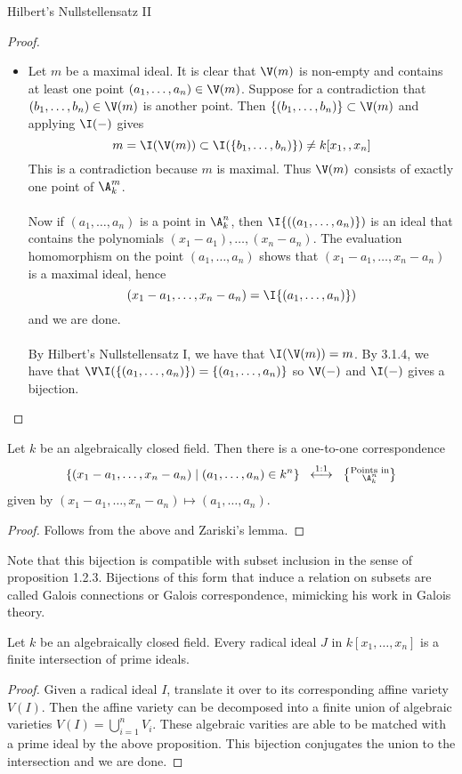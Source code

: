 \documentclass[a4paper]{article}
\begin{document}
\begin{thm}{Hilbert's Nullstellensatz II}{}
\begin{proof}
\begin{itemize}
\item Let $m$ be a maximal ideal. It is clear that $\V(m)$ is non-empty and contains at least one point $(a_1,\dots,a_n)\in\V(m)$. Suppose for a contradiction that $(b_1,\dots,b_n)\in\V(m)$ is another point. Then $\{(b_1,\dots,b_n)\}\subset\V(m)$ and applying $\I(-)$ gives $$m=\I(\V(m))\subset\I(\{b_1,\dots,b_n)\})\neq k[x_1,\do,x_n]$$ This is a contradiction because $m$ is maximal. Thus $\V(m)$ consists of exactly one point of $\A_k^m$. \\~\\

Now if $(a_1,\dots,a_n)$ is a point in $\A_k^n$, then $\I\{((a_1,\dots,a_n)\})$ is an ideal that contains the polynomials $(x_1-a_1),\dots,(x_n-a_n)$. The evaluation homomorphism on the point $(a_1,\dots,a_n)$ shows that $(x_1-a_1,\dots,x_n-a_n)$ is a maximal ideal, hence $$(x_1-a_1,\dots,x_n-a_n)=\I\{(a_1,\dots,a_n)\})$$ and we are done. \\~\\

By Hilbert's Nullstellensatz I, we have that $\I(\V(m))=m$. By 3.1.4, we have that $\V\I(\{(a_1,\dots,a_n)\})=\{(a_1,\dots,a_n)\}$ so $\V(-)$ and $\I(-)$ gives a bijection. 
\end{itemize}
\end{proof}
\end{thm}

\begin{lmm}{}{} Let $k$ be an algebraically closed field. Then there is a one-to-one correspondence $$\{(x_1-a_1,\dots,x_n-a_n)\;|\;(a_1,\dots,a_n)\in k^n\}\;\;\overset{\text{1:1}}{\longleftrightarrow}\;\;\left\{\substack{\text{Points in}\\\A_k^n}\right\}$$ given by $(x_1-a_1,\dots,x_n-a_n)\mapsto(a_1,\dots,a_n)$. \tcbline
\begin{proof}
Follows from the above and Zariski's lemma. 
\end{proof}
\end{lmm}

Note that this bijection is compatible with subset inclusion in the sense of proposition 1.2.3. Bijections of this form that induce a relation on subsets are called Galois connections or Galois correspondence, mimicking his work in Galois theory. 

\begin{prp}{}{} Let $k$ be an algebraically closed field. Every radical ideal $J$ in $k[x_1,\dots,x_n]$ is a finite intersection of prime ideals. \tcbline
\begin{proof}
Given a radical ideal $I$, translate it over to its corresponding affine variety $V(I)$. Then the affine variety can be decomposed into a finite union of algebraic varieties $V(I)=\bigcup_{i=1}^nV_i$. These algebraic varities are able to be matched with a prime ideal by the above proposition. This bijection conjugates the union to the intersection and we are done. 
\end{proof}
\end{prp}
\end{document}
